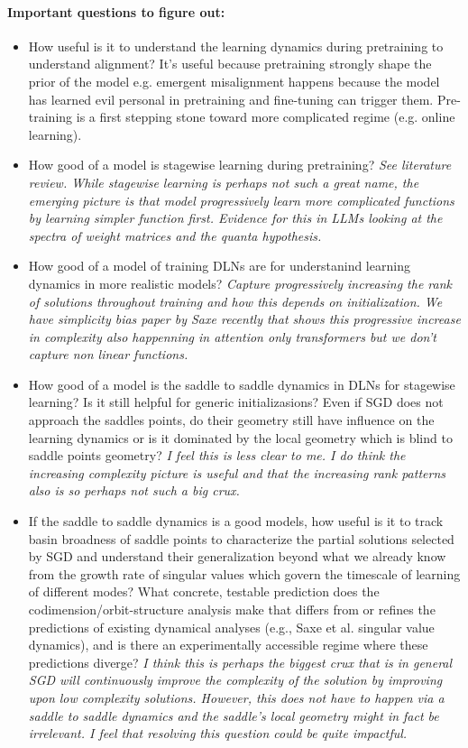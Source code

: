 \documentclass{article}
\theoremstyle{definition}
\begin{document}
\paragraph{Important questions to figure out:}
\begin{itemize}
    \item How useful is it to understand the learning dynamics during pretraining to understand alignment? It's useful because pretraining strongly shape the prior of the model e.g. emergent misalignment happens because the model has learned evil personal in pretraining and fine-tuning can trigger them. Pre-training is a first stepping stone toward more complicated regime (e.g. online learning).
    \item How good of a model is stagewise learning during pretraining? \textit{See literature review. While stagewise learning is perhaps not such a great name, the emerging picture is that model progressively learn more complicated functions by learning simpler function first. Evidence for this in LLMs looking at the spectra of weight matrices and the quanta hypothesis.} 
    \item How good of a model of training DLNs are for understanind learning dynamics in more realistic models? \textit{Capture progressively increasing the rank of solutions throughout training and how this depends on initialization. We have simplicity bias paper by Saxe recently that shows this progressive increase in complexity also happenning in attention only transformers but we don't capture non linear functions.}
    \item How good of a model is the saddle to saddle dynamics in DLNs for stagewise learning? Is it still helpful for generic initializasions? Even if SGD does not approach the saddles points, do their geometry still have influence on the learning dynamics or is it dominated by the local geometry which is blind to saddle points geometry? \textit{I feel this is less clear to me. I do think the increasing complexity picture is useful and that the increasing rank patterns also is so perhaps not such a big crux.}
    \item If the saddle to saddle dynamics is a good models, how useful is it to track basin broadness of saddle points to characterize the partial solutions selected by SGD and understand their generalization beyond what we already know from the growth rate of singular values which govern the timescale of learning of different modes? What concrete, testable prediction does the codimension/orbit-structure analysis make that differs from or refines the predictions of existing dynamical analyses (e.g., Saxe et al. singular value dynamics), and is there an experimentally accessible regime where these predictions diverge? \textit{I think this is perhaps the biggest crux that is in general SGD will continuously improve the complexity of the solution by improving upon low complexity solutions. However, this does not have to happen via a saddle to saddle dynamics and the saddle's local geometry might in fact be irrelevant. I feel that resolving this question could be quite impactful.}

\end{itemize}
\end{document}

